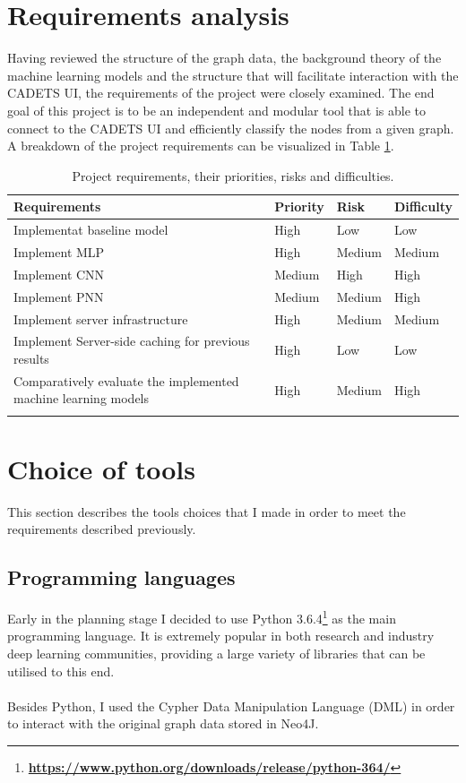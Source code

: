 	\section{Requirements analysis} \label{Section 2.4}
	Having reviewed the structure of the graph data, the background theory of the machine learning models and the structure that will facilitate interaction with the CADETS UI, the requirements of the project were closely examined. The end goal of this project is to be an independent and modular tool that is able to connect to the CADETS UI and efficiently classify the nodes from a given graph. A breakdown of the project requirements can be visualized in Table \ref{Table 2.2}.
	\begin{longtable}{|p{}|p{} p{} p{}|}
		\textbf{Requirements} & \textbf{Priority} & \textbf{Risk} & \textbf{Difficulty} \\
		\hline
		Implementat baseline model & High & Low & Low \\
		Implement MLP & High & Medium & Medium \\
		Implement CNN & Medium & High & High \\
		Implement PNN & Medium & Medium & High \\
		Implement server infrastructure & High & Medium & Medium \\
		Implement Server-side caching for previous results & High & Low & Low \\
		Comparatively evaluate the implemented machine learning models & High & Medium & High \\
		\hline
		\caption[Requirements overview]{\centering Project requirements, their priorities, risks and difficulties.}
		\label{Table 2.2}
	\end{longtable}
	\section{Choice of tools} \label{Section 2.5}
	This section describes the tools choices that I made in order to meet the requirements described previously. 
	\subsection{Programming languages} \label{Section 2.5.1}
	Early in the planning stage I decided to use Python 3.6.4\footnote{\textbf{\url{https://www.python.org/downloads/release/python-364/}}} as the main programming language. It is extremely popular in both research and industry deep learning communities, providing a large variety of libraries that can be utilised to this end. 
	\\ \\
	Besides Python, I used the Cypher Data Manipulation Language (DML) in order to interact with the original graph data stored in Neo4J.  
	
